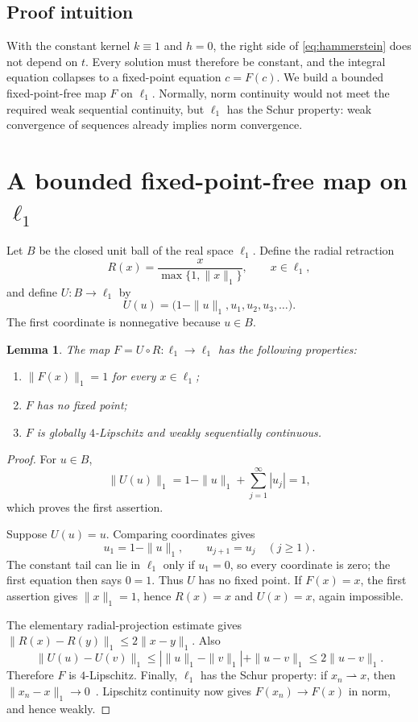 \documentclass[11pt]{article}
\newtheorem{lemma}{Lemma}
\begin{document}
\subsection*{Proof intuition}

With the constant kernel $k\equiv1$ and $h=0$, the right side of
\eqref{eq:hammerstein} does not depend on $t$.  Every solution must therefore
be constant, and the integral equation collapses to a fixed-point equation
$c=F(c)$.  We build a bounded fixed-point-free map $F$ on $\ell_1$.  Normally,
norm continuity would not meet the required weak sequential continuity, but
$\ell_1$ has the Schur property: weak convergence of sequences already implies
norm convergence.

\section{A bounded fixed-point-free map on \texorpdfstring{$\ell_1$}{l1}}

Let $B$ be the closed unit ball of the real space $\ell_1$.  Define the radial
retraction
\[
 R(x)=\frac{x}{\max\{1,\|x\|_1\}},\qquad x\in\ell_1,
\]
and define $U:B\to\ell_1$ by
\[
 U(u)=\bigl(1-\|u\|_1,u_1,u_2,u_3,\ldots\bigr).
\]
The first coordinate is nonnegative because $u\in B$.

\begin{lemma}\label{lem:F}
The map $F=U\circ R:\ell_1\to\ell_1$ has the following properties:
\begin{enumerate}
 \item $\|F(x)\|_1=1$ for every $x\in\ell_1$;
 \item $F$ has no fixed point;
 \item $F$ is globally $4$-Lipschitz and weakly sequentially continuous.
\end{enumerate}
\end{lemma}

\begin{proof}
For $u\in B$,
\[
 \|U(u)\|_1=1-\|u\|_1+\sum_{j=1}^{\infty}|u_j|=1,
\]
which proves the first assertion.

Suppose $U(u)=u$.  Comparing coordinates gives
\[
 u_1=1-\|u\|_1,\qquad u_{j+1}=u_j\quad(j\geq1).
\]
The constant tail can lie in $\ell_1$ only if $u_1=0$, so every coordinate is
zero; the first equation then says $0=1$.  Thus $U$ has no fixed point.  If
$F(x)=x$, the first assertion gives $\|x\|_1=1$, hence $R(x)=x$ and
$U(x)=x$, again impossible.

The elementary radial-projection estimate gives
$\|R(x)-R(y)\|_1\leq2\|x-y\|_1$.  Also
\[
 \|U(u)-U(v)\|_1
 \leq |\|u\|_1-\|v\|_1|+\|u-v\|_1
 \leq2\|u-v\|_1.
\]
Therefore $F$ is $4$-Lipschitz.  Finally, $\ell_1$ has the Schur property:
if $x_n\rightharpoonup x$, then $\|x_n-x\|_1\to0$~\cite{Schur}.  Lipschitz
continuity now gives $F(x_n)\to F(x)$ in norm, and hence weakly.
\end{proof}
\end{document}

